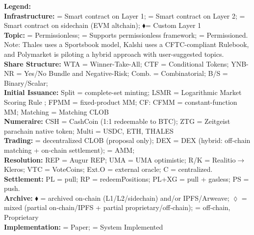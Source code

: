 \begin{table}[H]
{\begin{tabular}{|l|c|c|c|c|c|c|c|c|c|c|c|}
\end{tabular}
}

\vspace{0.30em}
\begin{minipage}{\textwidth}
\footnotesize
\textbf{Legend:} \\
\textbf{Infrastructure:} \Circle = Smart contract on Layer 1; \LEFTcircle = Smart  contract on Layer 2; \CIRCLE = Smart contract on sidechain (EVM altchain); $\blacklozenge$= Custom Layer 1\\
\textbf{Topic:} \CIRCLE = Permissionless; \LEFTcircle = Supports permissionless framework; \Circle = Permissioned. Note: Thales uses a Sportsbook model, Kalshi uses a CFTC-compliant Rulebook, and Polymarket is piloting a hybrid approach with user-suggested topics.\\
\textbf{Share Structure:} WTA = Winner-Take-All; CTF = Conditional Tokens; YNB-NR = Yes/No Bundle and Negative-Risk; Comb. = Combinatorial; B/S = Binary/Scalar; \\
\textbf{Initial Issuance:} Split = complete-set minting; LSMR = Logarithmic Market Scoring Rule ; FPMM = fixed-product MM; CF: CFMM = constant-function MM; Matching = Matching CLOB \\
\textbf{Numeraire:} CSH = CashCoin (1:1 redeemable to BTC); ZTG = Zeitgeist parachain native token; Multi = USDC, ETH, THALES \\
\textbf{Trading:} \CIRCLE = decentralized CLOB (proposal only); DEX =  DEX (hybrid: off-chain matching + on-chain settlement); \Circle = AMM;  \\
\textbf{Resolution:} REP = Augur REP; UMA = UMA optimistic; R/K = Realitio$\rightarrow$Kleros; VTC = VoteCoins; Ext.O = external oracle; C = centralized. \\
\textbf{Settlement:} PL = pull; RP = redeemPositions; PL+XG = pull + gasless; PS = push. \\
\textbf{Archive:} $\blacklozenge$ = archived on-chain (L1/L2/sidechain) and/or IPFS/Arweave; $\lozenge$ = mixed (partial on‑chain/IPFS + partial proprietary/off‑chain); \Circle = off-chain, Proprietary\\
\textbf{Implementation:} \Circle = Paper; \CIRCLE = System Implemented
\end{minipage}
\end{table} 